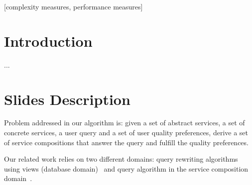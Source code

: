 \documentclass{sig-alternate}
\begin{document}
\maketitle
\begin{abstract}
...
\end{abstract}

[complexity measures, performance measures]



\section{Introduction}
...

\section{Slides Description}
Problem addressed in our algorithm is: given a set of abstract services, a set of concrete services, a user query and a set of user quality preferences, derive a set of service compositions that answer the query and fulfill the quality preferences.

Our related work relies on two different domains: query rewriting algorithms using views (database domain)~\cite{ref} and query algorithm in the service composition domain~\cite{ref}.
\end{document}
